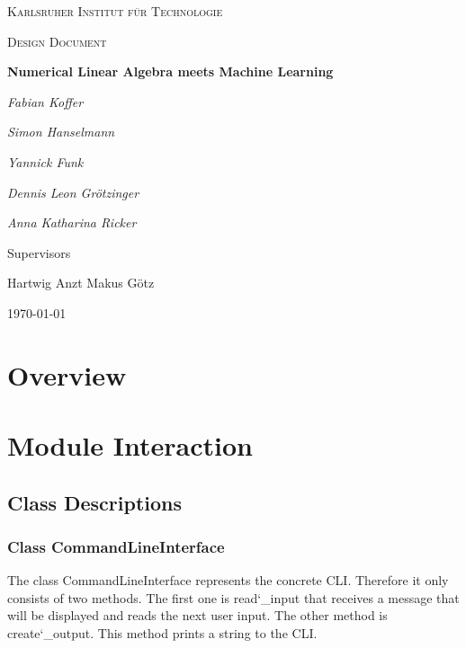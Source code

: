 \documentclass[parskip=full]{scrartcl}
\begin{document}
\begin{titlepage}
\centering
{\scshape\LARGE Karlsruher Institut für Technologie\par}
\vspace{1cm}
{\scshape\Large Design Document\par}
\vspace{1.5cm}
{\huge\bfseries Numerical Linear Algebra meets Machine Learning \par}
\vspace {2cm}

{\Large\itshape Fabian Koffer\par}
{\Large\itshape Simon Hanselmann\par}
{\Large\itshape Yannick Funk\par}
{\Large\itshape Dennis Leon Gr\"{o}tzinger\par}
{\Large\itshape Anna Katharina Ricker\par}

\vfill
Supervisors\par
Hartwig Anzt
Makus G\"{o}tz

\vfill
{\large\today\par}
\end{titlepage}

\tableofcontents
\newpage

\section{Overview}


\section{Module Interaction}

\subsection{Class Descriptions}

\subsubsection{Class CommandLineInterface}
The class CommandLineInterface represents the concrete \gls{CLI}. 
Therefore it only consists of two methods. 
The first one is read\char`_input that receives a message that will be displayed and reads the next user input. 
The other method is create\char`_output. 
This method prints a string to the CLI.
\end{document}

